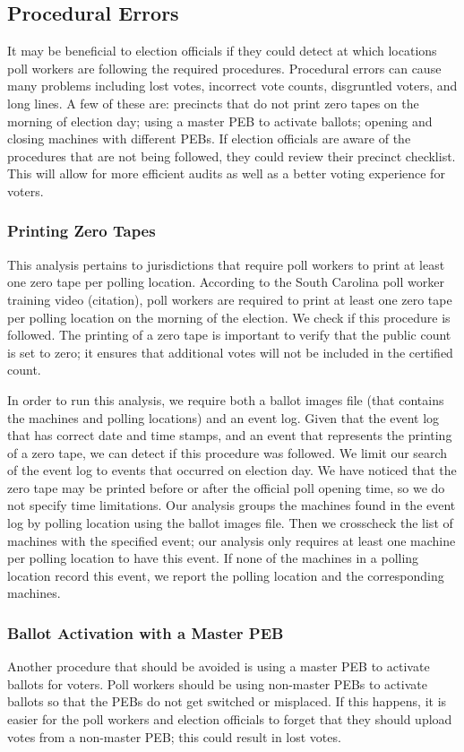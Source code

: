 \subsection{Procedural Errors}
It may be beneficial to election officials if they could detect at which locations poll workers are following the required procedures. Procedural errors can cause many problems including lost votes, incorrect vote counts, disgruntled voters, and long lines. A few of these are: precincts that do not print zero tapes on the morning of election day; using a master PEB to activate ballots; opening and closing machines with different PEBs. If election officials are aware of the procedures that are not being followed, they could review their precinct checklist. This will allow for more efficient audits as well as a better voting experience for voters.

\subsubsection{Printing Zero Tapes}
This analysis pertains to jurisdictions that require poll workers to print at least one zero tape per polling location.  According to the South Carolina poll worker training video (citation), poll workers are required to print at least one zero tape per polling location on the morning of the election.  We check if this procedure is followed.  The printing of a zero tape is important to verify that the public count is set to zero; it ensures that additional votes will not be included in the certified count.  

In order to run this analysis, we require both a ballot images file (that contains the machines and polling locations) and an event log.  Given that the event log that has correct date and time stamps, and an event that represents the printing of a zero tape, we can detect if this procedure was followed.  We limit our search of the event log to events that occurred on election day.  We have noticed that the zero tape may be printed before or after the official poll opening time, so we do not specify time limitations.  Our analysis groups the machines found in the event log by polling location using the ballot images file.  Then we crosscheck the list of machines with the specified event; our analysis only requires at least one machine per polling location to have this event.  If none of the machines in a polling location record this event, we report the polling location and the corresponding machines.

\subsubsection{Ballot Activation with a Master PEB}
Another procedure that should be avoided is using a master PEB to activate ballots for voters.  Poll workers should be using non-master PEBs to activate ballots so that the PEBs do not get switched or misplaced.  If this happens, it is easier for the poll workers and election officials to forget that they should upload votes from a non-master PEB; this could result in lost votes.

